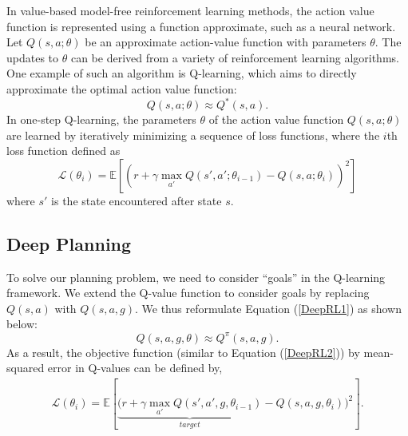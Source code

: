 \documentclass[letterpaper]{article}
\begin{document}
In value-based model-free reinforcement learning methods, the action value function is represented using a function approximate, such as a neural network. Let $Q(s,a;\theta)$ be an approximate action-value function with parameters $\theta$. The updates to $\theta$ can be derived from a variety of reinforcement learning algorithms. One example of such an algorithm is Q-learning, which aims to directly approximate the optimal action value function: 
\begin{equation}\label{DeepRL1}
Q(s,a;\theta) \approx Q^*(s,a).
\end{equation} 
In one-step Q-learning, the parameters $\theta$ of the action value function $Q(s,a;\theta)$ are learned by iteratively minimizing a sequence of loss functions, where the $i$th loss function defined as 
\begin{equation}\label{DeepRL2}
\mathcal{L}(\theta_i)=\mathbb{E}[(r+\gamma\max_{a'}Q(s',a';\theta_{i-1})-Q(s,a;\theta_i))^2]
\end{equation}
where $s'$ is the state encountered after state $s$.

\subsection{Deep Planning}
To solve our planning problem, we need to consider ``goals'' in the Q-learning framework. We extend the Q-value function to consider goals by replacing $Q(s,a)$ with $Q(s,a,g)$. We thus reformulate Equation (\ref{DeepRL1}) as shown below:
\begin{equation}
Q(s,a,g,\theta) \approx Q^{\pi}(s,a,g).
\end{equation}
As a result, the objective function (similar to Equation (\ref{DeepRL2})) by mean-squared error in Q-values can be defined by, 
\begin{eqnarray}
\mathcal{L}(\theta_i) = \mathbb{E}[\underbrace{(r+\gamma\max_{a'}Q(s',a',g,\theta_{i-1})}_{target}-Q(s,a,g,\theta_i))^2].
\end{eqnarray}
\end{document}
